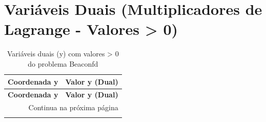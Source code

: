 \documentclass[12pt]{article}
\begin{document}
\begin{longtable}{@{}cccc@{}}
\bottomrule
\end{longtable}


\section{Variáveis Duais (Multiplicadores de Lagrange - Valores > 0)}

\begin{longtable}{@{}cc@{}}
\caption{Variáveis duais (y) com valores > 0 do problema Beaconfd} \\
\toprule
\textbf{Coordenada y} & \textbf{Valor y (Dual)} \\
\midrule
\endfirsthead

\toprule
\textbf{Coordenada y} & \textbf{Valor y (Dual)} \\
\midrule
\endhead

\midrule \multicolumn{2}{r}{{Continua na próxima página}} \\ \midrule
\endfoot


\end{longtable}
\end{document}
